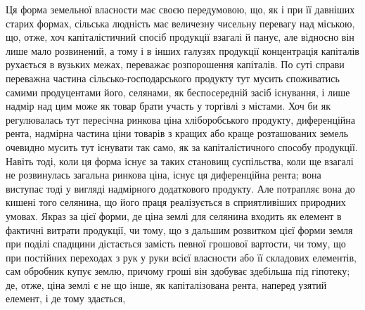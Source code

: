 Ця форма земельної власности має своєю передумовою, що, як і при її
давніших старих формах, сільська людність має величезну чисельну перевагу
над міською, що, отже, хоч капіталістичний спосіб продукції взагалі й панує,
але відносно він лише мало розвинений, а тому і в інших галузях продукції
концентрація капіталів рухається в вузьких межах, переважає розпорошення
капіталів. По суті справи переважна частина сільсько-господарського продукту
тут мусить споживатись самими продуцентами його, селянами, як беспосередній
засіб існування, і лише надмір над цим може як товар брати участь у торгівлі
з містами. Хоч би як регулювалась тут пересічна ринкова ціна хліборобського
продукту, диференційна рента, надмірна частина ціни товарів з кращих або
краще розташованих земель очевидно мусить тут існувати так само, як за
капіталістичного способу продукції. Навіть тоді, коли ця форма існує за таких
становищ суспільства, коли ще взагалі не розвинулась загальна ринкова ціна,
існує ця диференційна рента; вона виступає тоді у вигляді надмірного додаткового
продукту. Але потрапляє вона до кишені того селянина, що його праця
реалізується в сприятливіших природних умовах. Якраз за цієї форми, де ціна
землі для селянина входить як елемент в фактичні витрати продукції, чи тому,
що з дальшим розвитком цієї форми земля при поділі спадщини дістається замість
певної грошової вартости, чи тому, що при постійних переходах з рук
у руки всієї власности або її складових елементів, сам обробник купує землю,
причому гроші він здобуває здебільша під гіпотеку; де, отже, ціна землі є не
що інше, як капіталізована рента, наперед узятий елемент, і де тому здається,
\parbreak{}  %

